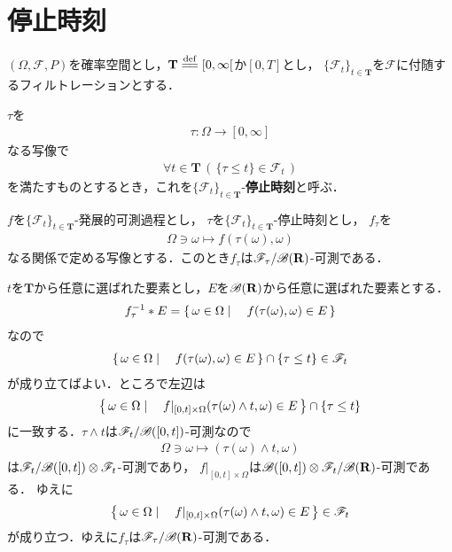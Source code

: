 \section{停止時刻}
	$(\Omega,\mathscr{F},P)$を確率空間とし，$\mathbf{T} \defeq [0,\infty[$か$[0,T]$とし，
	$\{\mathscr{F}_t\}_{t \in \mathbf{T}}$を$\mathscr{F}$に付随するフィルトレーションとする．
	
	$\tau$を
	\begin{align}
		\tau:\Omega \longrightarrow [0,\infty]
	\end{align}
	なる写像で
	\begin{align}
		\forall t \in \mathbf{T}\, \left(\, \{\tau \leq t\} \in \mathscr{F}_t\, \right)
	\end{align}
	を満たすものとするとき，これを$\{\mathscr{F}_t\}_{t \in \mathbf{T}}$-{\bf 停止時刻}と呼ぶ．
	
	\begin{screen}
		\begin{thm}[発展的可測過程と停止時刻の合成の可測性]
		\label{thm:composition_of_progressively_measurable_process_and_stopping_time}
			$f$を$\{\mathscr{F}_t\}_{t \in \mathbf{T}}$-発展的可測過程とし，
			$\tau$を$\{\mathscr{F}_t\}_{t \in \mathbf{T}}$-停止時刻とし，
			$f_\tau$を
			\begin{align}
				\Omega \ni \omega \longmapsto f(\tau(\omega),\omega)
			\end{align}
			なる関係で定める写像とする．このとき$f_\tau$は$\mathscr{F}_\tau/\mathscr{B}(\mathbf{R})$-可測である．
		\end{thm}
	\end{screen}
	
	\begin{sketch}
		$t$を$\mathbf{T}$から任意に選ばれた要素とし，$E$を$\mathscr{B}(\mathbf{R})$から任意に選ばれた要素とする．
		\begin{align}
			f_\tau^{-1} \ast E = \left\{\, \omega \in \Omega \mid \quad f(\tau(\omega),\omega) \in E\, \right\} 
		\end{align}
		なので
		\begin{align}
			\left\{\, \omega \in \Omega \mid \quad f(\tau(\omega),\omega) \in E\, \right\} \cap \{\tau \leq t\}
			\in \mathscr{F}_t
		\end{align}
		が成り立てばよい．ところで左辺は
		\begin{align}
			\left\{\, \omega \in \Omega \mid \quad f|_{[0,t] \times \Omega}(\tau(\omega) \wedge t,\omega) \in E\, \right\} \cap \{\tau \leq t\}
		\end{align}
		に一致する．$\tau \wedge t$は$\mathscr{F}_t/\mathscr{B}([0,t])$-可測なので
		\begin{align}
			\Omega \ni \omega \longmapsto (\tau(\omega) \wedge t,\omega)
		\end{align}
		は$\mathscr{F}_t/\mathscr{B}([0,t]) \otimes \mathscr{F}_t$-可測であり，
		$f|_{[0,t] \times \Omega}$は$\mathscr{B}([0,t]) \otimes \mathscr{F}_t/\mathscr{B}(\mathbf{R})$-可測である．
		ゆえに
		\begin{align}
			\left\{\, \omega \in \Omega \mid \quad f|_{[0,t] \times \Omega}(\tau(\omega) \wedge t,\omega) \in E\, \right\} \in \mathscr{F}_t
		\end{align}
		が成り立つ．ゆえに$f_\tau$は$\mathscr{F}_\tau/\mathscr{B}(\mathbf{R})$-可測である．
		\QED
	\end{sketch}
	
	\begin{screen}
		\begin{thm}[離散時間の任意抽出定理]
			
		\end{thm}
	\end{screen}
	